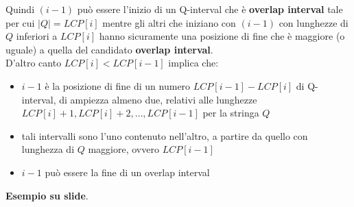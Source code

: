 \documentclass[a4paper,12pt, oneside]{book}
\begin{document}
Quindi $(i-1)$ può essere l'inizio di un Q-interval che è \textbf{overlap
  interval} tale per cui $|Q|=LCP[i]$ mentre gli altri che iniziano con $(i-1)$
con lunghezze di $Q$ inferiori a $LCP[i]$ hanno sicuramente una posizione di
fine che è maggiore (o uguale) a quella del candidato \textbf{overlap
  interval}.\\
D'altro canto $LCP[i] < LCP[i-1]$ implica che:
\begin{itemize}
  \item $i-1$ è la posizione di fine di un numero $LCP[i-1]-LCP[i]$
  di Q-interval, di ampiezza almeno due, relativi alle lunghezze
  $LCP[i]+1, LCP[i]+2, \ldots,LCP[i-1]$ per la stringa $Q$ 
  \item tali intervalli sono l'uno contenuto nell'altro, a partire da quello con
  lunghezza di $Q$ maggiore, ovvero $LCP[i-1]$
  \item $i-1$ può essere la fine di un overlap interval 
\end{itemize}
\textbf{Esempio su slide}.
\end{document}
